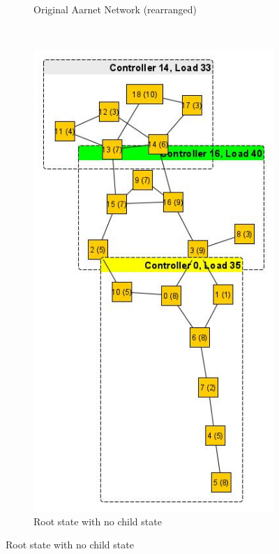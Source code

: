 \documentclass[journal]{IEEEtran}
\begin{document}
\begin{figure}
\begin{subfigure}{0.3\textwidth}
		\caption{Original Aarnet Network (rearranged)}
		\label{fig:aarnet2009}
	\end{subfigure}
	~
	\begin{subfigure}{0.3\textwidth}
		\includegraphics[width=\linewidth]{Images/Aarnet_Load_1.jpg}
		\caption{Root state with no child state}
		\label{fig:aarnet2009l1}
	\end{subfigure}

\end{figure}
\end{document}
